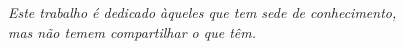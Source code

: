 \begin{dedicatoria}
   \vspace*{\fill}
   \centering
   \noindent

	\textit{Este trabalho é dedicado àqueles que tem sede de conhecimento,\\ mas não temem compartilhar o que têm.}

\vspace*{\fill}
\end{dedicatoria}
